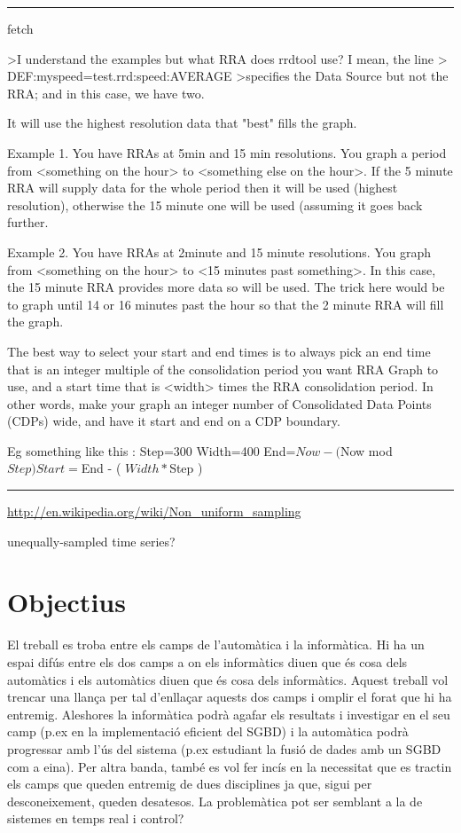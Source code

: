 \hrule


fetch

>I understand the examples but what RRA does rrdtool use? I mean, the line
>     DEF:myspeed=test.rrd:speed:AVERAGE
>specifies the Data Source but not the RRA; and in this case, we have two.

It will use the highest resolution data that "best" fills the graph.

Example 1. You have RRAs at 5min and 15 min resolutions. You graph a 
period from <something on the hour> to <something else on the hour>. 
If the 5 minute RRA will supply data for the whole period then it 
will be used (highest resolution), otherwise the 15 minute one will 
be used (assuming it goes back further.

Example 2.
You have RRAs at 2minute and 15 minute resolutions. You graph from 
<something on the hour> to <15 minutes past something>. In this case, 
the 15 minute RRA provides more data so will be used. The trick here 
would be to graph until 14 or 16 minutes past the hour so that the 2 
minute RRA will fill the graph.

The best way to select your start and end times is to always pick an 
end time that is an integer multiple of the consolidation period you 
want RRA Graph to use, and a start time that is <width> times the RRA 
consolidation period. In other words, make your graph an integer 
number of Consolidated Data Points (CDPs) wide, and have it start and 
end on a CDP boundary.

Eg something like this :
Step=300
Width=400
End=$Now - ( $Now mod $Step)
Start=$End - ( $Width * $Step )



\hrule


\url{http://en.wikipedia.org/wiki/Non_uniform_sampling}

unequally-sampled time series?



\section{Objectius}

El treball es troba entre els camps de l'automàtica i la informàtica. Hi ha un espai difús entre els dos camps a on els informàtics diuen que és cosa dels automàtics i els automàtics diuen que és cosa dels informàtics.  Aquest treball vol trencar una llança per tal d'enllaçar aquests dos camps i omplir el forat que hi ha entremig. Aleshores la informàtica podrà agafar els resultats i investigar en el seu camp (p.ex en la implementació eficient del SGBD) i la automàtica podrà progressar amb l'ús del sistema (p.ex estudiant la fusió de dades amb un SGBD com a eina). Per altra banda, també es vol fer incís en la necessitat que es tractin els camps que queden entremig de dues disciplines ja que, sigui per desconeixement, queden desatesos.
La problemàtica pot ser semblant a la de sistemes en temps real i control?




